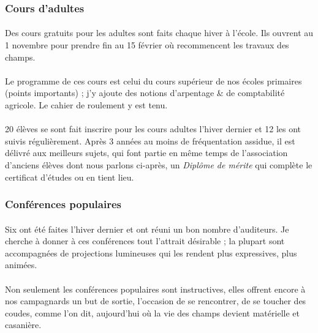 \documentclass[../eBook.tex]{subfiles}
\begin{document}
    \subsubsection*{Cours d'adultes}
      \paragraph{}Des cours gratuits pour les adultes sont faits chaque hiver à l'école. Ils ouvrent au 1 novembre pour prendre fin au 15 février où recommencent les travaux des champs.
      \paragraph{}Le programme de ces cours est celui du cours supérieur de nos écoles primaires (points importants) ; j'y ajoute des notions d'arpentage \& de comptabilité agricole. Le cahier de roulement y est tenu.
      \paragraph{}20 élèves se sont fait inscrire pour les cours adultes l'hiver dernier et 12 les ont suivis régulièrement. Après 3 années au moins de fréquentation assidue, il est délivré aux meilleurs sujets, qui font partie en même temps de l'association d'anciens élèves dont nous parlons ci-après, un \textit{Diplôme de mérite} qui complète le certificat d'études ou en tient lieu.

    \subsubsection*{Conférences populaires}
      \paragraph{}Six ont été faites l'hiver dernier et ont réuni un bon nombre d'auditeurs. Je cherche à donner à ces conférences tout l'attrait désirable ; la plupart sont accompagnées de projections lumineuses qui les rendent plus expressives, plus animées.
      \paragraph{}Non seulement les conférences populaires sont instructives, elles offrent encore à nos campagnards un but de sortie, l'occasion de se rencontrer, de se toucher des coudes, comme l'on dit, aujourd'hui où la vie des champs devient matérielle et casanière.
\end{document}
